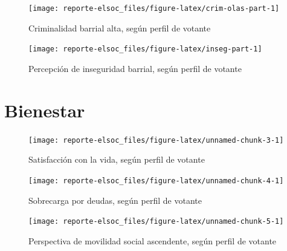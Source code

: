 \documentclass[
  12pt,
]{book}
\begin{document}
\begin{figure}

{\centering \texttt{[image: reporte-elsoc\_files/figure-latex/crim-olas-part-1]} 

}

\caption{Criminalidad barrial alta, según perfil de votante}\label{fig:crim-olas-part}
\end{figure}

\begin{figure}

{\centering \texttt{[image: reporte-elsoc\_files/figure-latex/inseg-part-1]} 

}

\caption{Percepción de inseguridad barrial, según perfil de votante}\label{fig:inseg-part}
\end{figure}

\hypertarget{bienestar}{%
\section{Bienestar}\label{bienestar}}

\begin{figure}

{\centering \texttt{[image: reporte-elsoc\_files/figure-latex/unnamed-chunk-3-1]} 

}

\caption{Satisfacción con la vida, según perfil de votante}\label{fig:unnamed-chunk-3}
\end{figure}

\begin{figure}

{\centering \texttt{[image: reporte-elsoc\_files/figure-latex/unnamed-chunk-4-1]} 

}

\caption{Sobrecarga por deudas, según perfil de votante}\label{fig:unnamed-chunk-4}
\end{figure}

\begin{figure}

{\centering \texttt{[image: reporte-elsoc\_files/figure-latex/unnamed-chunk-5-1]} 

}

\caption{Perspectiva de movilidad social ascendente, según perfil de votante}\label{fig:unnamed-chunk-5}
\end{figure}
\end{document}
